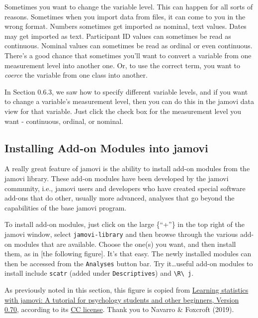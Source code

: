 \documentclass[
]{book}
\begin{document}
Sometimes you want to change the variable level. This can happen for all sorts of reasons. Sometimes when you import data from files, it can come to you in the wrong format. Numbers sometimes get imported as nominal, text values. Dates may get imported as text. Participant ID values can sometimes be read as continuous. Nominal values can sometimes be read as ordinal or even continuous. There's a good chance that sometimes you'll want to convert a variable from one measurement level into another one. Or, to use the correct term, you want to \emph{coerce} the variable from one class into another.

In Section 0.6.3, we saw how to specify different variable levels, and if you want to change a variable's measurement level, then you can do this in the jamovi data view for that variable. Just click the check box for the measurement level you want - continuous, ordinal, or nominal.

\hypertarget{installing-add-on-modules-into-jamovi}{%
\subsection{Installing Add-on Modules into jamovi}\label{installing-add-on-modules-into-jamovi}}

A really great feature of jamovi is the ability to install add-on modules from the jamovi library. These add-on modules have been developed by the jamovi community, i.e., jamovi users and developers who have created special software add-ons that do other, usually more advanced, analyses that go beyond the capabilities of the base jamovi program.

To install add-on modules, just click on the large \large\{``+''\} in the top right of the jamovi window, select \texttt{jamovi-library} and then browse through the various add-on modules that are available. Choose the one(s) you want, and then install them, as in {[}the following figure{]}. It's that easy. The newly installed modules can then be accessed from the \texttt{Analyses} button bar. Try it\ldots useful add-on modules to install include \texttt{scatr} (added under \texttt{Descriptives}) and \texttt{\textbackslash{}R\textbackslash{}\ j}.

As previously noted in this section, this figure is copied from \href{https://www.learnstatswithjamovi.com/}{Learning statistics with jamovi: A tutorial for psychology students and other beginners, Version 0.70}, according to its \href{https://creativecommons.org/licenses/by-sa/4.0/deed.ast}{CC license}. Thank you to Navarro \& Foxcroft (2019).
\end{document}
